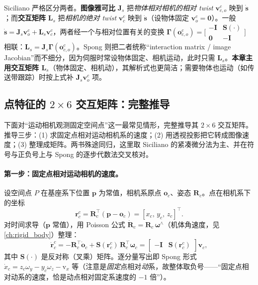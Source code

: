 \begin{note}\label{note:vs-Ls-vs-Js}
Siciliano\cite{siciliano2009robotics} 严格区分两者。\textbf{图像雅可比} $\mathbf{J}_s$ 把\emph{物体相对相机的相对 twist} $\mathbf{v}_{c,o}^c$ 映到 $\dot{\mathbf{s}}$；而\textbf{交互矩阵} $\mathbf{L}_s$ 把\emph{相机的绝对 twist} $\mathbf{v}_c^c$ 映到 $\dot{\mathbf{s}}$（设物体固定 $\mathbf{v}_o^c=\mathbf{0}$）。一般 $\dot{\mathbf{s}}=\mathbf{J}_s\mathbf{v}_o^c+\mathbf{L}_s\mathbf{v}_c^c$，两者经一个与相对位置有关的变换 $\boldsymbol{\Gamma}(\mathbf{o}_{c,o}^c)=\big[\begin{smallmatrix}-\mathbf{I}&\mathbf{S}(\cdot)\\\mathbf{0}&-\mathbf{I}\end{smallmatrix}\big]$ 相联：$\mathbf{L}_s=\mathbf{J}_s\boldsymbol{\Gamma}(\mathbf{o}_{c,o}^c)$。Spong\cite{spong2006robot} 则把二者统称“interaction matrix / image Jacobian”而不细分，因为伺服时常设物体固定、相机运动，此时只需 $\mathbf{L}_s$。\textbf{本章主用交互矩阵 $\mathbf{L}_s$}（物体固定、相机动），其解析式也更简洁；需要物体也运动（如传送带跟踪）时按上式补 $\mathbf{J}_s\mathbf{v}_o^c$ 项。
\end{note}

\subsection{点特征的 \texorpdfstring{$2\times6$}{2x6} 交互矩阵：完整推导}
\label{sec:vs-interaction-point}

下面对“运动相机观测固定空间点”这一最常见情形，完整推导其 $2\times6$ 交互矩阵。推导三步：(1) 求固定点相对运动相机系的速度；(2) 用透视投影把它转成图像速度；(3) 整理成矩阵。两书殊途同归，这里取 Siciliano 的紧凑微分法\cite{siciliano2009robotics}为主、并在符号与正负号上与 Spong 的逐步代数法\cite{spong2006robot}交叉核对。

\paragraph{第一步：固定点相对运动相机的速度。}
设空间点 $P$ 在基座系下位置 $\mathbf{p}$ 为常值，相机系原点 $\mathbf{o}_c$、姿态 $\mathbf{R}_c$。点在相机系下的坐标
\begin{equation}
  \mathbf{r}_c^c=\mathbf{R}_c^\top(\mathbf{p}-\mathbf{o}_c)=[x_c,\,y_c,\,z_c]^\top.
  \label{eq:vs-point-cam}
\end{equation}
对时间求导（$\mathbf{p}$ 常值），用 Poisson 公式 $\dot{\mathbf{R}}_c=\mathbf{R}_c\,\boldsymbol{\omega}^\wedge$（机体角速度，见 \cref{ch:rigid_body}）整理：
\begin{equation}
  \dot{\mathbf{r}}_c^c
  =-\mathbf{R}_c^\top\dot{\mathbf{o}}_c+\mathbf{S}(\mathbf{r}_c^c)\,\mathbf{R}_c^\top\boldsymbol{\omega}_c
  =\begin{bmatrix}-\mathbf{I}&\mathbf{S}(\mathbf{r}_c^c)\end{bmatrix}\mathbf{v}_c,
  \label{eq:vs-rdot}
\end{equation}
其中 $\mathbf{S}(\cdot)$ 是反对称（叉乘）矩阵。逐分量写出即 Spong 形式 $\dot{x}_c=z_c\omega_y-y_c\omega_z-\mathrm{v}_x$ 等（注意是\emph{固定}点相对\emph{动}系，故整体取负号——“固定点相对动系的速度，恰是动点相对固定系速度的 $-1$ 倍”\cite{spong2006robot}）。

